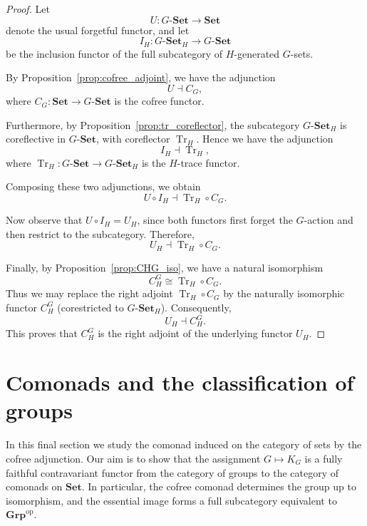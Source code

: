 \documentclass{amsart}
\begin{document}
\begin{proof}
Let
\[
U \colon G\text{-}\mathbf{Set} \longrightarrow \mathbf{Set}
\]
denote the usual forgetful functor, and let
\[
I_H \colon G\text{-}\mathbf{Set}_H \longrightarrow G\text{-}\mathbf{Set}
\]
be the inclusion functor of the full subcategory of $H$-generated $G$-sets.

By Proposition~\ref{prop:cofree_adjoint}, we have the adjunction
\[
U \dashv C_G,
\]
where $C_G \colon \mathbf{Set} \longrightarrow G\text{-}\mathbf{Set}$ is the cofree functor.

Furthermore, by Proposition~\ref{prop:tr_coreflector}, the subcategory $G\text{-}\mathbf{Set}_H$ is coreflective in $G\text{-}\mathbf{Set}$, with coreflector $\operatorname{Tr}_H$. Hence we have the adjunction
\[
I_H \dashv \operatorname{Tr}_H,
\]
where $\operatorname{Tr}_H \colon G\text{-}\mathbf{Set} \longrightarrow G\text{-}\mathbf{Set}_H$ is the $H$-trace functor.

Composing these two adjunctions, we obtain
\[
U \circ I_H \dashv \operatorname{Tr}_H \circ C_G.
\]

Now observe that $U \circ I_H = U_H$, since both functors first forget the $G$-action and then restrict to the subcategory. Therefore,
\[
U_H \dashv \operatorname{Tr}_H \circ C_G.
\]

Finally, by Proposition~\ref{prop:CHG_iso}, we have a natural isomorphism
\[
C_H^G \cong \operatorname{Tr}_H \circ C_G.
\]
Thus we may replace the right adjoint $\operatorname{Tr}_H \circ C_G$ by the naturally isomorphic functor $C_H^G$ (corestricted to $G\text{-}\mathbf{Set}_H$). Consequently,
\[
U_H \dashv C_H^G.
\]
This proves that $C_H^G$ is the right adjoint of the underlying functor $U_H$.
\end{proof}

\section{Comonads and the classification of groups}
\label{sec:comonads}

In this final section we study the comonad induced on the category of sets by the cofree adjunction. Our aim is to show that the assignment $G \mapsto K_G$ is a fully faithful contravariant functor from the category of groups to the category of comonads on $\mathbf{Set}$. In particular, the cofree comonad determines the group up to isomorphism, and the essential image forms a full subcategory equivalent to $\mathbf{Grp}^{\mathrm{op}}$.
\end{document}
